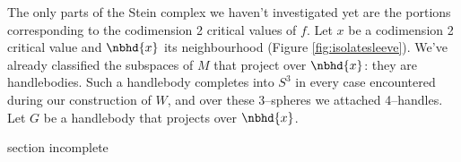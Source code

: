 	The only parts of the Stein complex we haven't investigated yet are the portions corresponding to the codimension 2 critical values of $f$.
	Let $x$ be a codimension 2 critical value and $\nbhd{x}$ its neighbourhood (Figure \ref{fig:isolatesleeve}).
	We've already classified the subspaces of $M$ that project over $\nbhd{x}$: they are handlebodies.
	Such a handlebody completes into $S^3$ in every case encountered during our construction of $W$, and over these 3--spheres we attached 4--handles.
	Let $G$ be a handlebody that projects over $\nbhd{x}$.
	
	
	\newpage
	{
		section incomplete
	}
	\newpage
	
	
	
	
	
	
	